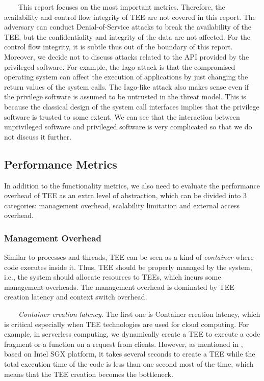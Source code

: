 \documentclass[12pt,twoside]{report}
\begin{document}
\ \ \ \ This report focuses on the most important metrics. Therefore, the availability and control flow integrity of TEE are not covered in this report. The adversary can conduct Denial-of-Service attacks to break the availability of the TEE, but the confidentiality and integrity of the data are not affected. For the control flow integrity, it is subtle thus out of the boundary of this report. Moreover, we decide not to discuss attacks related to the API provided by the privileged software. For example, the Iago attack\cite{checkoway2013iago} is that the compromised operating system can affect the execution of applications by just changing the return values of the system calls. The Iago-like attack also makes sense even if the privilege software is assumed to be untrusted in the threat model. This is because the classical design of the system call interfaces implies that the privilege software is trusted to some extent. We can see that the interaction between unprivileged software and privileged software is very complicated so that we do not discuss it further.

\subsection{Performance Metrics}

In addition to the functionality metrics, we also need to evaluate the performance overhead of TEE as an extra level of abstraction, which can be divided into 3 categories: management overhead, scalability limitation and external access overhead.

\subsubsection{Management Overhead}

Similar to processes and threads, TEE can be seen as a kind of \textit{container} where code executes inside it. Thus, TEE should be properly managed by the system, i.e., the system should allocate resources to TEEs, which incurs some management overheads. The management overhead is dominated by TEE creation latency and context switch overhead.

\ \ \ \ \textit{Container creation latency}. The first one is Container creation latency, which is critical especially when TEE technologies are used for cloud computing. For example, in serverless computing, we dynamically create a TEE to execute a code fragment or a function on a request from clients. However, as mentioned in \cite{feng2021scalable}, based on Intel SGX\cite{mckeen2013innovative} platform, it takes several seconds to create a TEE while the total execution time of the code is less than one second  most of the time, which means that the TEE creation becomes the bottleneck.
\end{document}
